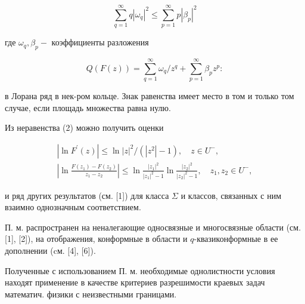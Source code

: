 \documentclass[10pt]{article}
\begin{document}
\[

\sum_{q=1}^{\infty} q\left|\omega_{q}\right|^{2} \leqslant \sum_{p=1}^{\infty} p\left|\beta_{p}\right|^{2}

\]



где $\omega_{q}, \beta_{p}-$ коэффициенты разложения



\[

Q(F(z))=\sum_{q=1}^{\infty} \omega_{q} / z^{q}+\sum_{p=1}^{\infty} \beta_{p} z^{p}:

\]



в Лорана ряд в нек-ром кольце. Знак равенства имеет место в том и только том случае, если площадь множества равна нулю.



Из неравенства (2) можно получить оценки



\[

\begin{gathered}

\left|\ln F^{\prime}(z)\right| \leqslant \ln |z|^{2} /\left(\left|z^{2}\right|-1\right), \quad z \in U^{-}, \\

\left|\ln \frac{F\left(z_{1}\right)-F\left(z_{2}\right)}{z_{1}-z_{2}}\right| \leqslant \ln \frac{\left|z_{1}\right|^{2}}{\left|z_{1}\right|^{2}-1} \ln \frac{\left|z_{2}\right|^{2}}{\left|z_{2}\right|^{2}-1}, \quad z_{1}, z_{2} \in U^{-},

\end{gathered}

\]



и ряд других результатов (см. [1]) для класса $\Sigma$ и классов, связанных с ним взаимно однозначным соответствием.



П. м. распространен на неналегающие односвязные и многосвязные области (см. [1], [2]), на отображения, конформные в области и $q$-квазиконформные в ее дополнении (cм. [4], [6]).



Полученные с использованием П. м. необходимые однолистности условия находят применение в качестве критериев разрешимости краевых задач математич. физики с неизвестными границами.
\end{document}
